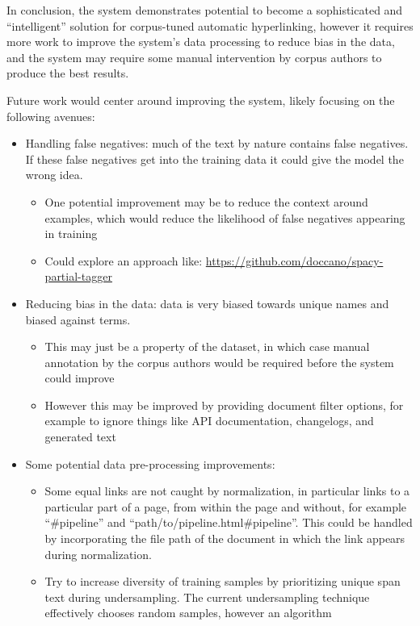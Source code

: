 \documentclass[manuscript,screen,review]{acmart}
\begin{document}
In conclusion, the system demonstrates potential to become a
sophisticated and ``intelligent'' solution for corpus-tuned automatic
hyperlinking, however it requires more work to improve the system's
data processing to reduce bias in the data, and the system may require
some manual intervention by corpus authors to produce the best
results.

Future work would center around improving the system, likely focusing
on the following avenues:

\begin{itemize}
\item Handling false negatives: much of the text by nature contains false
negatives. If these false negatives get into the training data it
could give the model the wrong idea.
\begin{itemize}
\item One potential improvement may be to reduce the context around
examples, which would reduce the likelihood of false negatives
appearing in training
\item Could explore an approach like:
\url{https://github.com/doccano/spacy-partial-tagger}
\end{itemize}
\item Reducing bias in the data: data is very biased towards unique names
and biased against terms.
\begin{itemize}
\item This may just be a property of the dataset, in which case manual
annotation by the corpus authors would be required before the
system could improve
\item However this may be improved by providing document filter options,
for example to ignore things like API documentation, changelogs,
and generated text
\end{itemize}
\item Some potential data pre-processing improvements:
\begin{itemize}
\item Some equal links are not caught by normalization, in particular
links to a particular part of a page, from within the page and
without, for example ``\#pipeline'' and
``path/to/pipeline.html\#pipeline''. This could be handled by
incorporating the file path of the document in which the link
appears during normalization.
\item Try to increase diversity of training samples by prioritizing
unique span text during undersampling. The current undersampling
technique effectively chooses random samples, however an algorithm

\end{itemize}
\end{itemize}
\end{document}

